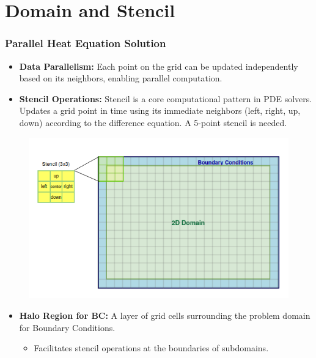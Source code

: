 \documentclass[9pt]{beamer}
\begin{document}
\section{Domain and Stencil}
\begin{frame}
\frametitle{Parallel Heat Equation Solution}
\vspace{-0.5\baselineskip}
\scriptsize
    \begin{itemize}
        \item \textbf{Data Parallelism:} Each point on the grid can be updated independently based on its neighbors, enabling parallel computation.
        \item \textbf{Stencil Operations:} Stencil is a core computational pattern in PDE solvers. Updates a grid point in time using its immediate neighbors (left, right, up, down) according to the difference equation. A 5-point stencil is needed.
    \end{itemize}    
    \vspace{-0.5\baselineskip}
    \begin{figure}
        \centering
        \includegraphics[width=0.6\linewidth]{Screenshot from 2024-08-30 14-18-30.png}
        \label{fig:enter-label}
    \end{figure}
    \begin{itemize}
        \item \textbf{Halo Region for BC:} A layer of grid cells surrounding the problem domain for Boundary Conditions.
        \begin{itemize}
            \item Facilitates stencil operations at the boundaries of subdomains.
        \end{itemize}
    \end{itemize}
\end{frame}
\end{document}
